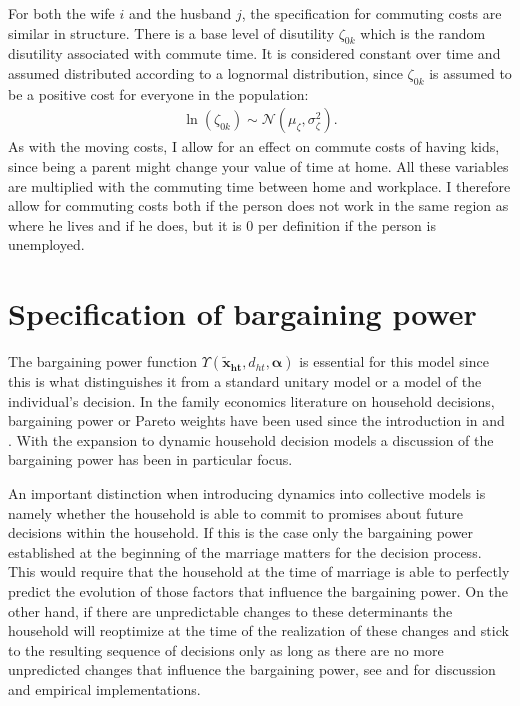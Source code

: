 For both the wife $i$ and the husband $j$, the specification for commuting costs are similar in structure. There is a base level of disutility $\zeta_{0k}$ which is the random disutility associated with commute time. It is considered constant over time and assumed distributed according to a lognormal distribution, since $\zeta_{0k}$ is assumed to be a positive cost for everyone in the population:
\begin{align*}
\ln(\zeta_{0k})\sim \mathcal{N}(\mu_{\zeta},\sigma_{\zeta}^2).
\end{align*}
 As with the moving costs, I allow for an effect on commute costs of having kids, since being a parent might change your value of time at home. All these variables are multiplied with the commuting time between home and workplace. I therefore allow for commuting costs both if the person does not work in the same region as where he lives and if he does, but it is 0 per definition if the person is unemployed. 


\section{Specification of bargaining power}
The bargaining power function $\Upsilon(\boldsymbol{\tilde{x}_{ht}},d_{ht},\boldsymbol{\alpha})$ is essential for this model since this is what distinguishes it from a standard unitary model or a model of the individual's decision. In the family economics literature on household decisions, bargaining power or Pareto weights have been used since the introduction in \cite{ManserBrown1980} and \cite{McElroyetal1981}. With the expansion to dynamic household decision models a discussion of the bargaining power has been in particular focus. 

An important distinction when introducing dynamics into collective models is namely whether the household is able to commit to promises about future decisions within the household. If this is the case only the bargaining power established at the beginning of the marriage matters for the decision process. This would require that the household at the time of marriage is able to perfectly predict the evolution of those factors that influence the bargaining power. On the other hand, if there are unpredictable changes to these determinants the household will reoptimize at the time of the realization of these changes and stick to the resulting sequence of decisions only as long as there are no more unpredicted changes that influence the bargaining power, see \cite{LundbergPollak2003,Ligon2011,Theloudis2016} and \cite{Mazzocco2007} for discussion and empirical implementations. 

